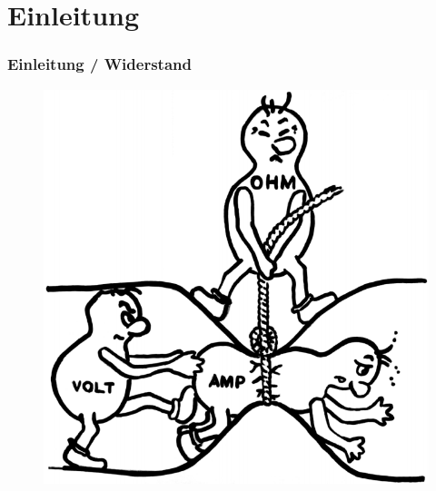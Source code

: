 

\subtitle{Technik Klasse A 02: \\
  Der Widerstand und seine Schaltungsarten \\[2em]}
\date{Stand 09.01.2017}



\section{Einleitung}

\begin{frame}
  \frametitle{Einleitung / Widerstand}
  \begin{center}
    \begin{figure}
      \includegraphics[width=.7\textwidth,height=.75\textheight,keepaspectratio]{e04/URI.png}
    \end{figure}
  \end{center}
\end{frame}


